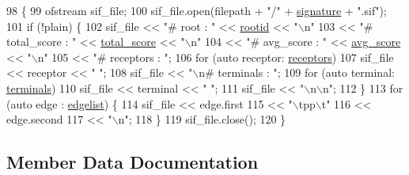 \begin{DoxyCode}
98                                                       \{
99     ofstream sif\_file;
100     sif\_file.open(filepath + \textcolor{stringliteral}{"/"} + \hyperlink{structderegnet_1_1Subgraph_aae642b8b0b71de5539218040b0d7e201}{signature} + \textcolor{stringliteral}{".sif"});
101     \textcolor{keywordflow}{if} (!plain) \{
102         sif\_file << \textcolor{stringliteral}{"# root : "} << \hyperlink{structderegnet_1_1Subgraph_a0e214a14649dcd35959c619cbdd9ce2b}{rootid} << \textcolor{stringliteral}{"\(\backslash\)n"}
103                  << \textcolor{stringliteral}{"# total\_score : "} << \hyperlink{structderegnet_1_1Subgraph_a3fdd10c0e803822ae09a71e5b549e471}{total\_score} << \textcolor{stringliteral}{"\(\backslash\)n"}
104                  << \textcolor{stringliteral}{"# avg\_score : "} << \hyperlink{structderegnet_1_1Subgraph_ad2836fb4bf0db09a91363f5fc894a02a}{avg\_score} << \textcolor{stringliteral}{"\(\backslash\)n"}
105                  << \textcolor{stringliteral}{"# receptors : "};
106         \textcolor{keywordflow}{for} (\textcolor{keyword}{auto} receptor: \hyperlink{structderegnet_1_1Subgraph_a2a818ffe02ceced905ef38cb9a5253df}{receptors})
107             sif\_file << receptor << \textcolor{stringliteral}{" "};
108         sif\_file << \textcolor{stringliteral}{"\(\backslash\)n# terminals : "};
109         \textcolor{keywordflow}{for} (\textcolor{keyword}{auto} terminal: \hyperlink{structderegnet_1_1Subgraph_a030ed025dd1e2e38c48147283a93bd61}{terminals})
110             sif\_file << terminal << \textcolor{stringliteral}{" "};
111         sif\_file << \textcolor{stringliteral}{"\(\backslash\)n\(\backslash\)n"};
112     \}
113     \textcolor{keywordflow}{for} (\textcolor{keyword}{auto} edge : \hyperlink{structderegnet_1_1Subgraph_a918a816236f30355b2ec812af629db09}{edgelist}) \{
114         sif\_file << edge.first
115                  << \textcolor{stringliteral}{"\(\backslash\)tpp\(\backslash\)t"}
116                  << edge.second
117                  << \textcolor{stringliteral}{"\(\backslash\)n"};
118     \}
119     sif\_file.close();
120 \}
\end{DoxyCode}


\subsection{Member Data Documentation}
